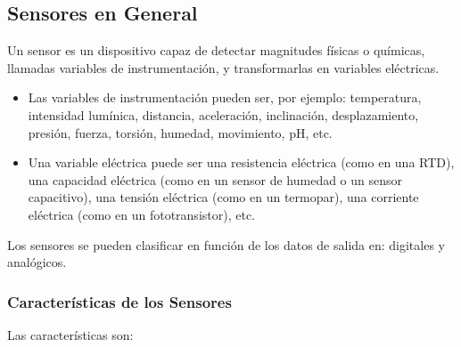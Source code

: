 \subsection{Sensores en General}

\par
Un sensor es un dispositivo capaz de detectar magnitudes físicas o químicas, llamadas variables de instrumentación, y transformarlas en variables eléctricas.\cite{sensores-wiki}

\begin{itemize}
	\item Las variables de instrumentación pueden ser, por ejemplo: temperatura, intensidad lumínica, distancia, aceleración, inclinación, desplazamiento, presión, fuerza, torsión, humedad, movimiento, pH, etc.\cite{sensores-wiki}
	
	\item Una variable eléctrica puede ser una resistencia eléctrica (como en una RTD), una capacidad eléctrica (como en un sensor de humedad o un sensor capacitivo), una tensión eléctrica (como en un termopar), una corriente eléctrica (como en un fototransistor), etc.\cite{sensores-wiki}
\end{itemize}

\par \noindent
Los sensores se pueden clasificar en función de los datos de salida en: digitales y analógicos\cite{sensores-arduino}.

\subsubsection{Características de los Sensores}

\par \noindent
Las características son\cite{sensores-wiki}:

